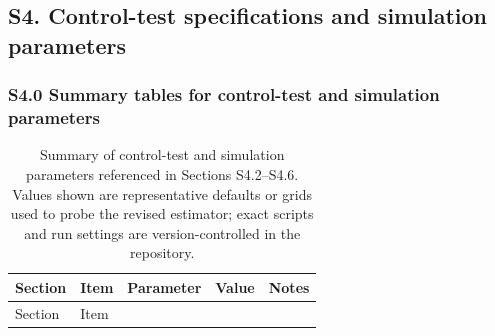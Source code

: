 \documentclass[
]{article}
\begin{document}
\subsection{S4. Control-test specifications and simulation parameters}\label{s4.-control-test-specifications-and-simulation-parameters}

\subsubsection{S4.0 Summary tables for control-test and simulation parameters}\label{s4.0-summary-tables-for-control-test-and-simulation-parameters}

\begin{longtable}[]{@{}
  >{\raggedright\arraybackslash}p{}
  >{\raggedright\arraybackslash}p{}
  >{\raggedright\arraybackslash}p{}
  >{\raggedright\arraybackslash}p{}
  >{\raggedright\arraybackslash}p{}@{}}
\caption{Summary of control-test and simulation parameters referenced in Sections S4.2--S4.6. Values shown are representative defaults or grids used to probe the revised estimator; exact scripts and run settings are version-controlled in the repository.}\label{tbl:si_sim_params}\tabularnewline
\toprule\noalign{}
\begin{minipage}[b]{\linewidth}\raggedright
Section
\end{minipage} & \begin{minipage}[b]{\linewidth}\raggedright
Item
\end{minipage} & \begin{minipage}[b]{\linewidth}\raggedright
Parameter
\end{minipage} & \begin{minipage}[b]{\linewidth}\raggedright
Value
\end{minipage} & \begin{minipage}[b]{\linewidth}\raggedright
Notes
\end{minipage} \\
\midrule\noalign{}
\endfirsthead
\toprule\noalign{}
\begin{minipage}[b]{\linewidth}\raggedright
Section
\end{minipage} & \begin{minipage}[b]{\linewidth}\raggedright
Item
\end{minipage} & \begin{minipage}[b]{\linewidth}\raggedright

\end{minipage}
\end{longtable}
\end{document}
